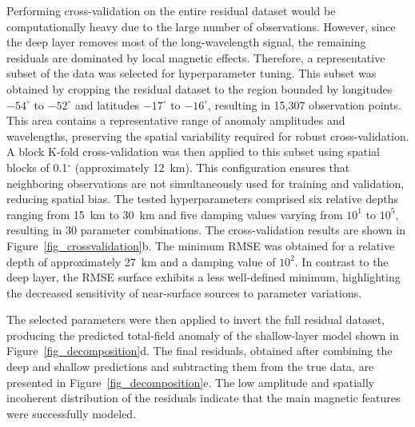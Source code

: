 \documentclass[onecolumn,10pt,a4paper]{article}
\providecommand{\DIFaddtex}[1]{{\protect\color{blue}\uwave{#1}}} %
\providecommand{\DIFaddbegin}{} %
\providecommand{\DIFaddend}{} %
\providecommand{\DIFadd}[1]{\texorpdfstring{\DIFaddtex{#1}}{#1}} %
\newcommand{\DIFaddincludegraphics}[2][]{{\color{blue}\fbox{\DIFOincludegraphics[#1]{#2}}}} %
\DeclareRobustCommand{\DIFaddbegin}{\DIFOaddbegin \let\includegraphics\DIFaddincludegraphics} %
\DeclareRobustCommand{\DIFaddend}{\DIFOaddend \let\includegraphics\DIFOincludegraphics} %
\begin{document}
Performing cross-validation on the entire residual dataset would be
computationally heavy due to the large number of observations.
However, since
the deep layer removes most of the long-wavelength signal, the remaining
residuals are dominated by local magnetic effects. Therefore, a
representative subset of the data was selected for hyperparameter tuning.
This subset was obtained by cropping the residual dataset to the region
bounded by longitudes $-54^{\circ}$ to $-52^{\circ}$ and latitudes
$-17^{\circ}$ to $-16^{\circ}$, resulting in 15,307 observation points. This
area contains a representative range of anomaly amplitudes and wavelengths,
preserving the spatial variability required for robust cross-validation.
A block K-fold cross-validation was then applied to this subset using spatial
blocks of 0.1$^\circ$ (approximately 12~km). This configuration ensures that neighboring
observations are not simultaneously used for training and validation,
reducing spatial bias. The tested hyperparameters comprised six relative
depths ranging from 15~km to 30~km and five damping values varying from $10^{1}$
to $10^{5}$, resulting in 30 parameter combinations.
The cross-validation results are shown in
Figure~\ref{fig_crossvalidation}b. The minimum RMSE \DIFaddbegin \DIFadd{of $357.5$ }\DIFaddend was obtained for a relative
depth of approximately 27~km and a damping value of $10^{2}$. In contrast to
the deep layer, the RMSE surface exhibits a less well-defined minimum,
highlighting the decreased sensitivity of near-surface sources to parameter
variations.

The selected parameters were then applied to invert the full residual
dataset, producing the predicted total-field anomaly of the shallow-layer model shown in
Figure~\ref{fig_decomposition}d. The final residuals, obtained after combining
the deep and shallow predictions and subtracting them from the true data, are presented in
Figure~\ref{fig_decomposition}e. The low amplitude and spatially incoherent
distribution of the residuals indicate that the main magnetic features were
successfully modeled.
\end{document}
